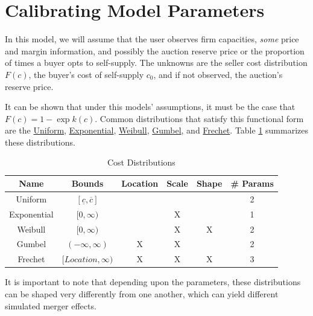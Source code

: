 \documentclass[11pt,numbers=noenddot,pointlessnumbers]{scrreprt}
\numberwithin{equation}{section}
\begin{document}
\section{Calibrating Model Parameters}
In this model, we will assume that the user observes firm capacities,
\emph{some} price and margin information, and possibly the auction
reserve price or the proportion of times a buyer opts to
self-supply. The unknowns are the seller cost distribution
$F(c)$, the buyer's cost of self-supply $c_0$, and if not observed,
the auction's reserve price.

It can be shown that under this models' assumptions, it must be the
case that $F(c)=1-\exp{k(c)}$. Common distributions that satisfy this
functional form are the
\href{http://en.wikipedia.org/wiki/Uniform\_distribution\_(continuous)}{Uniform},
\href{http://en.wikipedia.org/wiki/Exponential\_distribution}{Exponential},
\href{http://en.wikipedia.org/wiki/Weibull\_distribution}{Weibull},
\href{http://en.wikipedia.org/wiki/Gumbel\_distribution}{Gumbel}, and
\href{http://en.wikipedia.org/wiki/Frechet\_distribution}{Frechet}.
 Table \ref{tab:CostDistributions} summarizes these distributions.

    \begin{table}[htps]
      \centering
      \begin{tabular}{cccccc}
        Name        & Bounds                         & Location  & Scale & Shape & \# Params\\ \hline\hline
        Uniform     & $[\underline{c},\overline{c}]$ &           &       &       &    2     \\
        Exponential & $[0,\infty)$                   &           &   X   &       &    1     \\
        Weibull     & $[0,\infty)$                   &           &   X   &   X   &    2     \\
     Gumbel         & $(-\infty,\infty)$             &    X      &   X   &       &    2     \\
     Frechet        & $[Location,\infty)$            &    X      &   X   &   X   &    3     \\\hline
\end{tabular}
      \caption{Cost Distributions}
      \label{tab:CostDistributions}
    \end{table}

It is important to note that depending upon the parameters, these
distributions can be shaped very differently from one another, which
can yield different simulated merger effects.
\end{document}
